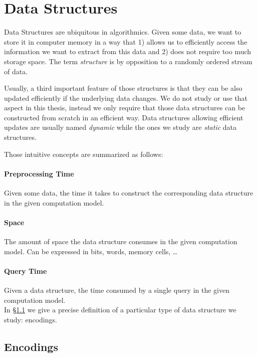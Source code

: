 \section{Data Structures}%

Data Structures are ubiquitous in algorithmics. Given some data, we want to
store it in computer memory in a way that 1) allows us to efficiently access
the information we want to extract from this data and 2) does not require too
much storage space. The term \emph{structure} is by opposition to a randomly
ordered stream of data.

Usually, a third important feature of those structures is that they can be also
updated efficiently if the underlying data changes. We do not study or use that
aspect in this thesis, instead we only require that those data structures can
be constructed from scratch in an efficient way. Data
structures allowing efficient updates are usually named \emph{dynamic}
while the ones we study are \emph{static} data structures.

Those intuitive concepts are summarized as follows:

\paragraph{Preprocessing Time} Given some data, the time it takes to construct
the corresponding data structure in the given computation model.

\paragraph{Space} The amount of space the data structure consumes in the given
computation model. Can be expressed in bits, words, memory cells, \dots

\paragraph{Query Time} Given a data structure, the time consumed by a
single query in the given computation model.
\\

In \S\ref{sec:models-of-computation:data-structures:encodings} we give a precise
definition of a particular type of data structure we study: encodings.

\subsection{Encodings}%
\label{sec:models-of-computation:data-structures:encodings}

